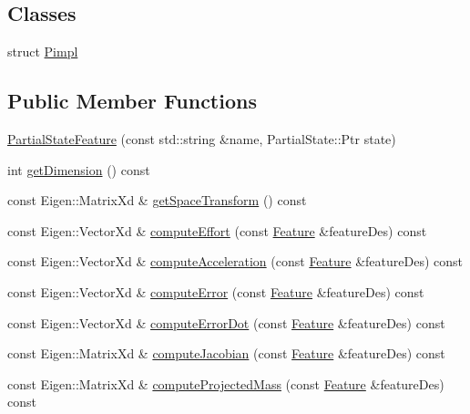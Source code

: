 \subsection*{Classes}
\begin{DoxyCompactItemize}
\item 
struct \hyperlink{structocra_1_1PartialStateFeature_1_1Pimpl}{Pimpl}
\end{DoxyCompactItemize}
\subsection*{Public Member Functions}
\begin{DoxyCompactItemize}
\item 
\hyperlink{classocra_1_1PartialStateFeature_a07a8b02519ae7a77580f8e2deefc86dd}{Partial\+State\+Feature} (const std\+::string \&name, Partial\+State\+::\+Ptr state)
\item 
int \hyperlink{classocra_1_1PartialStateFeature_a15b65bc093b9578fc60c04490e0dd73d}{get\+Dimension} () const
\item 
const Eigen\+::\+Matrix\+Xd \& \hyperlink{classocra_1_1PartialStateFeature_ac22525347f868a352d4fa2cab69a12d6}{get\+Space\+Transform} () const
\item 
const Eigen\+::\+Vector\+Xd \& \hyperlink{classocra_1_1PartialStateFeature_a96de4c58baceb9430a1845c4db6ecdfc}{compute\+Effort} (const \hyperlink{classocra_1_1Feature}{Feature} \&feature\+Des) const
\item 
const Eigen\+::\+Vector\+Xd \& \hyperlink{classocra_1_1PartialStateFeature_a42af1ac22fc5d9832e134f507a77bfad}{compute\+Acceleration} (const \hyperlink{classocra_1_1Feature}{Feature} \&feature\+Des) const
\item 
const Eigen\+::\+Vector\+Xd \& \hyperlink{classocra_1_1PartialStateFeature_af109d0d3c367db31f45f46fcc7c669c8}{compute\+Error} (const \hyperlink{classocra_1_1Feature}{Feature} \&feature\+Des) const
\item 
const Eigen\+::\+Vector\+Xd \& \hyperlink{classocra_1_1PartialStateFeature_a5abaab0eb99ac60f0150c4137960ee14}{compute\+Error\+Dot} (const \hyperlink{classocra_1_1Feature}{Feature} \&feature\+Des) const
\item 
const Eigen\+::\+Matrix\+Xd \& \hyperlink{classocra_1_1PartialStateFeature_a8b70dbff8a1a06f16621d34b3e8bc5cf}{compute\+Jacobian} (const \hyperlink{classocra_1_1Feature}{Feature} \&feature\+Des) const
\item 
const Eigen\+::\+Matrix\+Xd \& \hyperlink{classocra_1_1PartialStateFeature_a9554341f9015361e4c7dc544f6415470}{compute\+Projected\+Mass} (const \hyperlink{classocra_1_1Feature}{Feature} \&feature\+Des) const

\end{DoxyCompactItemize}
